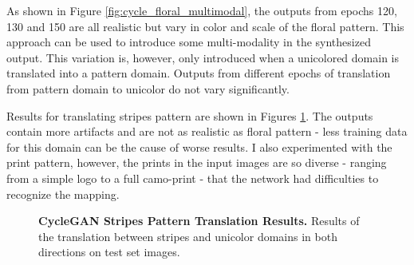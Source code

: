 \documentclass[12pt]{report}
\begin{document}
As shown in Figure \ref{fig:cycle_floral_multimodal}, the outputs from epochs 120, 130 and 150 are all realistic but vary in color and scale of the floral pattern. This approach can be used to introduce some multi-modality in the synthesized output. This variation is, however, only introduced when a unicolored domain is translated into a pattern domain. Outputs from different epochs of translation from pattern domain to unicolor do not vary significantly.

Results for translating stripes pattern are shown in Figures \ref{fig:cycle_stripes_results}. The outputs contain more artifacts and are not as realistic as floral pattern - less training data for this domain can be the cause of worse results. I also experimented with the print pattern, however, the prints in the input images are so diverse - ranging from a simple logo to a full camo-print - that the network had difficulties to recognize the mapping.

\begin{figure}[h]
\centering
{}
\caption{\label{fig:cycle_stripes_results} \textbf{CycleGAN Stripes Pattern Translation Results.} Results of the translation between stripes and unicolor domains in both directions on test set images.}
\end{figure}
\end{document}
